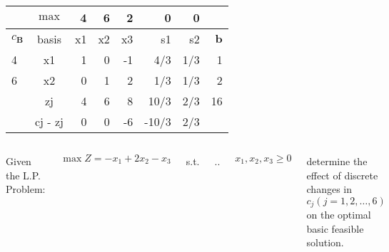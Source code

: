 \begin{frameExample}{\label{example:6.6-2.1}}{}
\begin{onlyenv}
  \begin{table}[!ht]
    \centering
    \begin{tabular}{lc|rrrrr|r}
    \toprule
      ~ &$\max$ & 4 & 6 & 2 & 0 & 0 & ~ \\
      \midrule
      $c_{\boldsymbol{B}}$ & basis & x1 & x2 & x3 & s1 & s2 & $\boldsymbol{b}$ \\
      \midrule
        4 & x1 & 1 & 0 & -1 &  4/3  &  1/3  & 1 \\ 
      6 & x2 & 0 & 1 & 2 &  1/3  &  1/3  & 2 \\
      \midrule
        ~ & zj & 4 & 6 & 8 & 10/3  &  2/3  & 16 \\ 
        ~ & cj - zj & 0 & 0 & -6 & -10/3  &  2/3 \\ 
    \end{tabular}
\end{table}
  
\end{onlyenv}
\end{frameExample}



\begin{frameExample}{}{}

      \begin{columns}
    Given the L.P. Problem:

    $\max Z = -x_1 + 2x_2 - x_3$

    
    s.t.

    \vspace{5mm}
    \sysdelim..%

    \vspace{5mm}

    $x_1,x_2,x_3 \geq 0$

    determine the effect of discrete changes in $c_j (j = 1,2,\ldots,6)$ on the optimal basic feasible solution.
  \end{columns}

\end{frameExample}

